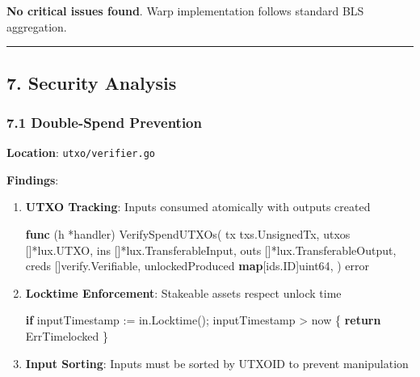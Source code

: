 \documentclass[
]{article}
\newenvironment{Shaded}{}{}
\newcommand{\ControlFlowTok}[1]{\textcolor[rgb]{0.00,0.44,0.13}{\textbf{#1}}}
\newcommand{\DataTypeTok}[1]{\textcolor[rgb]{0.56,0.13,0.00}{#1}}
\newcommand{\KeywordTok}[1]{\textcolor[rgb]{0.00,0.44,0.13}{\textbf{#1}}}
\newcommand{\NormalTok}[1]{#1}
\newcommand{\OperatorTok}[1]{\textcolor[rgb]{0.40,0.40,0.40}{#1}}
\begin{document}
\textbf{No critical issues found}. Warp implementation follows standard
BLS aggregation.

\begin{center}\rule{0.5\linewidth}{0.5pt}\end{center}

\subsection{7. Security Analysis}\label{7-security-analysis}

\subsubsection{7.1 Double-Spend
Prevention}\label{71-double-spend-prevention}

\textbf{Location}: \texttt{utxo/verifier.go}

\textbf{Findings}:

\begin{enumerate}
\def\labelenumi{\arabic{enumi}.}
\item
  \textbf{UTXO Tracking}: Inputs consumed atomically with outputs
  created

\begin{Shaded}
\begin{Highlighting}[]
\KeywordTok{func} \OperatorTok{(}\NormalTok{h }\OperatorTok{*}\NormalTok{handler}\OperatorTok{)}\NormalTok{ VerifySpendUTXOs}\OperatorTok{(}
\NormalTok{    tx txs}\OperatorTok{.}\NormalTok{UnsignedTx}\OperatorTok{,}
\NormalTok{    utxos }\OperatorTok{[]*}\NormalTok{lux}\OperatorTok{.}\NormalTok{UTXO}\OperatorTok{,}
\NormalTok{    ins }\OperatorTok{[]*}\NormalTok{lux}\OperatorTok{.}\NormalTok{TransferableInput}\OperatorTok{,}
\NormalTok{    outs }\OperatorTok{[]*}\NormalTok{lux}\OperatorTok{.}\NormalTok{TransferableOutput}\OperatorTok{,}
\NormalTok{    creds }\OperatorTok{[]}\NormalTok{verify}\OperatorTok{.}\NormalTok{Verifiable}\OperatorTok{,}
\NormalTok{    unlockedProduced }\KeywordTok{map}\OperatorTok{[}\NormalTok{ids}\OperatorTok{.}\NormalTok{ID}\OperatorTok{]}\DataTypeTok{uint64}\OperatorTok{,}
\OperatorTok{)} \DataTypeTok{error}
\end{Highlighting}
\end{Shaded}
\item
  \textbf{Locktime Enforcement}: Stakeable assets respect unlock time

\begin{Shaded}
\begin{Highlighting}[]
\ControlFlowTok{if}\NormalTok{ inputTimestamp }\OperatorTok{:=}\NormalTok{ in}\OperatorTok{.}\NormalTok{Locktime}\OperatorTok{();}\NormalTok{ inputTimestamp }\OperatorTok{\textgreater{}}\NormalTok{ now }\OperatorTok{\{}
    \ControlFlowTok{return}\NormalTok{ ErrTimelocked}
\OperatorTok{\}}
\end{Highlighting}
\end{Shaded}
\item
  \textbf{Input Sorting}: Inputs must be sorted by UTXOID to prevent
  manipulation
\end{enumerate}
\end{document}
